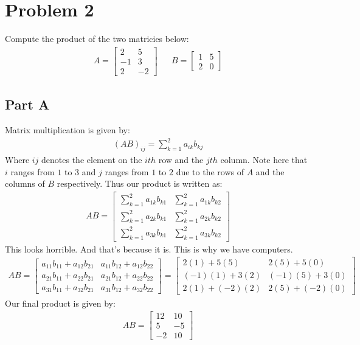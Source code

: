 \documentclass{article}
\begin{document}
\section*{Problem 2}
Compute the product of the two matricies below:
\begin{align*}
A = \begin{bmatrix}
2 & 5 \\
-1 & 3 \\
2 & -2
\end{bmatrix} && \boxed{ B = \begin{bmatrix}
1 & 5 \\
2 & 0
\end{bmatrix}}
\end{align*}

\subsection*{Part A}
Matrix multiplication is given by:
\begin{align*}
(AB)_{ij} = \sum_{k=1}^{2} a_{ik} b_{kj}
\end{align*}
Where $ij$ denotes the element on the $ith$ row and the $jth$ column. Note here that $i$ ranges from $1$ to $3$ and $j$ ranges from $1$ to $2$ due to the rows of $A$ and the columns of $B$ respectively.
Thus our product is written as:
\begin{align*}
AB = \begin{bmatrix}
\sum_{k=1}^{2} a_{1k} b_{k1} & \sum_{k=1}^{2} a_{1k} b_{k2} \\
\sum_{k=1}^{2} a_{2k} b_{k1} & \sum_{k=1}^{2} a_{2k} b_{k2} \\
\sum_{k=1}^{2} a_{3k} b_{k1} & \sum_{k=1}^{2} a_{3k} b_{k2}
\end{bmatrix}
\end{align*}
This looks horrible. And that's because it is. This is why we have computers.
\begin{align*}
AB = \begin{bmatrix}
a_{11} b_{11} + a_{12} b_{21} & a_{11} b_{12} + a_{12} b_{22}\\
a_{21} b_{11} + a_{22} b_{21} & a_{21} b_{12} + a_{22} b_{22}\\
a_{31} b_{11} + a_{32} b_{21} & a_{31} b_{12} + a_{32} b_{22}
\end{bmatrix} = \begin{bmatrix}
2 (1) + 5 (5) & 2 (5) + 5 (0)\\
(-1) (1) + 3 (2) & (-1) (5) + 3 (0)\\
2 (1) + (-2) (2) & 2 (5) + (-2) (0)
\end{bmatrix}
\end{align*}
Our final product is given by:
\begin{align*}
\boxed{AB = \begin{bmatrix}
12 & 10\\
5 & -5 \\
-2 & 10
\end{bmatrix}}
\end{align*}
\end{document}
